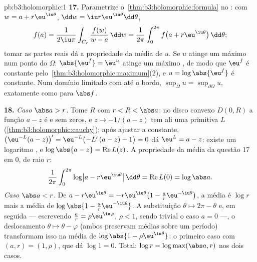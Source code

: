 \begin{solution}{pb:b3:holomorphic:1}
\textbf{17.} Parametrize o~\cref{thm:b3:holomorphic:formula}
no : com $w = a + r\eu^{\iu\theta}$, $\dd w = \iu
r\eu^{\iu\theta}\dd\theta$,
\[
f(a) = \frac1{2\iu\pi}\int_{C_r}\frac{f(w)}{w - a}\,\dd w
= \frac1{2\pi}\int_0^{2\pi}
f\bigl(a + r\eu^{\iu\theta}\bigr)\,\dd\theta ;
\]
tomar as partes reais dá a propriedade da média de $u$. Se
$u$ atinge um máximo num ponto  do 
$\Omega$: $\abs{\eu^f} = \eu^u$ atinge um máximo ,
de modo que $\eu^f$ é constante pelo~\cref{thm:b3:holomorphic:maximum}(2), e $u =
\log\abs{\eu^f}$ é constante. Num domínio limitado com
 até o bordo, $\sup_{\bar\Omega}u =
\sup_{\partial\Omega}u$, exatamente como para $\abs f$.

\textbf{18.} \emph{Caso $\abs a > r$.} Tome $R$ com $r < R
< \abs a$: no disco convexo $D(0, R)$ a função $a - z$
é  e sem zeros, e $z \mapsto -1/(a - z)$ tem
ali uma primitiva $L$ (\cref{thm:b3:holomorphic:cauchy});
após ajustar a constante, $\bigl(\eu^{-L}(a -
z)\bigr)' = \eu^{-L}\bigl(-L'\,(a - z) - 1\bigr) = 0$ dá
$\eu^L = a - z$: existe um logaritmo , e
$\log\abs{a - z} = \operatorname{Re}L(z)$. A propriedade da média
da questão 17 em $0$, de raio $r$:
\[
\frac1{2\pi}\int_0^{2\pi}
\log\bigl|a - r\eu^{\iu\theta}\bigr|\,\dd\theta
= \operatorname{Re}L(0) = \log\abs a .
\]
\emph{Caso $\abs a < r$.} De $a - r\eu^{\iu\theta} =
-r\eu^{\iu\theta}\bigl(1 - \frac ar\eu^{-\iu\theta}\bigr)$,
a média é $\log r$ mais a média de $\log\abs{1 -
\frac ar\eu^{-\iu\theta}}$. A substituição $\theta \mapsto
2\pi - \theta$ e, em seguida --- escrevendo $\frac ar =
\rho\eu^{\iu\varphi}$, $\rho < 1$, sendo trivial o caso $a = 0$ ---, o deslocamento $\theta \mapsto \theta - \varphi$
(ambos preservam médias sobre um período) transformam isso na média
de $\log\abs{1 - \rho\eu^{\iu\theta}}$: o primeiro caso com
$(a, r) = (1, \rho)$, que dá $\log 1 = 0$. Total:
$\log r = \log\max(\abs a, r)$ nos dois casos.


\end{solution}
